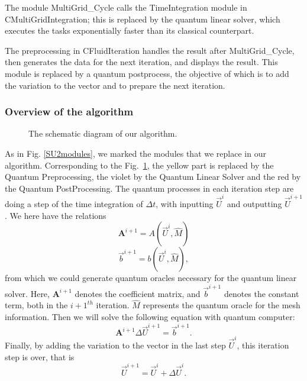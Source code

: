 \documentclass[%
 reprint,
 amsmath,amssymb,
pra,
]{revtex4-1}
\begin{document}
The module MultiGrid\_Cycle calls the TimeIntegration module in CMultiGridIntegration; this is replaced by the quantum linear solver, which executes the tasks exponentially faster than its classical counterpart.

The preprocessing in CFluidIteration handles the result after MultiGrid\_Cycle, then generates the data for the next iteration, and displays the result. This module is replaced by a quantum postprocess, the objective of which is to add the variation to the vector and to prepare the next iteration.

\subsubsection{Overview of the algorithm}

\begin{figure}[htbp]
    \caption{The schematic diagram of our algorithm. }
    \label{QuantumProcess1} 
\end{figure}

As in Fig. \ref{SU2modules}, we marked the modules that we replace in our algorithm. Corresponding to the Fig.~\ref{QuantumProcess1}, the yellow part is replaced by the Quantum Preprocessing, the violet by the Quantum Linear Solver and the red by the Quantum PostProcessing. The quantum processes in each iteration step are doing a step of the time integration of $\Delta t$, with inputting $\vec{U}^i$ and outputting $\vec{U}^{i+1}$. We here have the relations
\begin{equation}
\bm{A}^{i+1}=A(\vec{U}^i,\hat{M})
\end{equation}
\begin{equation}
\vec{b}^{i+1}=b(\vec{U}^i,\hat{M}),
\end{equation}
from which we could generate quantum oracles necessary for the quantum linear solver. Here, $\bm{A}^{i+1}$ denotes the coefficient matrix, and $\vec{b}^{i+1}$ denotes the constant term, both in the ${i+1}^{th}$ iteration. $\hat{M}$ represents the quantum oracle for the mesh information. Then we will solve the following equation with quantum computer:
\begin{equation}
\bm{A}^{i+1}\Delta \vec{U}^{i+1}=\vec{b}^{i+1}.
\end{equation}
Finally, by adding the variation to the vector in the last step $\vec{U}^i$, this iteration step is over, that is
\begin{equation}
\vec{U}^{i+1}=\vec{U}^i+\Delta \vec{U}^{i}.
\end{equation}
\end{document}
